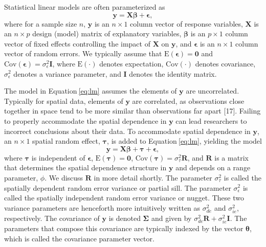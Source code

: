\documentclass[10pt,letterpaper]{article}
\begin{document}
Statistical linear models are often parameterized as
\begin{equation}\label{eq:lm}
 \mathbf{y} = \mathbf{X} \boldsymbol{\beta} + \boldsymbol{\epsilon},
\end{equation} where for a sample size \(n\), \(\mathbf{y}\) is an
\(n \times 1\) column vector of response variables, \(\mathbf{X}\) is an
\(n \times p\) design (model) matrix of explanatory variables,
\(\boldsymbol{\beta}\) is an \(p \times 1\) column vector of fixed
effects controlling the impact of \(\mathbf{X}\) on \(\mathbf{y}\), and
\(\boldsymbol{\epsilon}\) is an \(n \times 1\) column vector of random
errors. We typically assume that
\(\text{E}(\boldsymbol{\epsilon}) = \mathbf{0}\) and
\(\text{Cov}(\boldsymbol{\epsilon}) = \sigma^2_\epsilon \mathbf{I}\),
where \(\text{E}(\cdot)\) denotes expectation, \(\text{Cov}(\cdot)\)
denotes covariance, \(\sigma^2_\epsilon\) denotes a variance parameter,
and \(\mathbf{I}\) denotes the identity matrix.

The model in Equation\(~\)\ref{eq:lm} assumes the elements of
\(\mathbf{y}\) are uncorrelated. Typically for spatial data, elements of
\(\mathbf{y}\) are correlated, as observations close together in space
tend to be more similar than observations far apart {[}17{]}. Failing to
properly accommodate the spatial dependence in \(\mathbf{y}\) can lead
researchers to incorrect conclusions about their data. To accommodate
spatial dependence in \(\mathbf{y}\), an \(n \times 1\) spatial random
effect, \(\boldsymbol{\tau}\), is added to Equation\(~\)\ref{eq:lm},
yielding the model \begin{equation}\label{eq:splm}
 \mathbf{y} = \mathbf{X} \boldsymbol{\beta} + \boldsymbol{\tau} + \boldsymbol{\epsilon},
\end{equation} where \(\boldsymbol{\tau}\) is independent of
\(\boldsymbol{\epsilon}\), \(\text{E}(\boldsymbol{\tau}) = \mathbf{0}\),
\(\text{Cov}(\boldsymbol{\tau}) = \sigma^2_\tau \mathbf{R}\), and
\(\mathbf{R}\) is a matrix that determines the spatial dependence
structure in \(\mathbf{y}\) and depends on a range parameter, \(\phi\).
We discuss \(\mathbf{R}\) in more detail shortly. The parameter
\(\sigma^2_\tau\) is called the spatially dependent random error
variance or partial sill. The parameter \(\sigma^2_\epsilon\) is called
the spatially independent random error variance or nugget. These two
variance parameters are henceforth more intuitively written as
\(\sigma^2_{de}\) and \(\sigma^2_{ie}\), respectively. The covariance of
\(\mathbf{y}\) is denoted \(\boldsymbol{\Sigma}\) and given by
\(\sigma^2_{de} \mathbf{R} + \sigma^2_{ie} \mathbf{I}\). The parameters
that compose this covariance are typically indexed by the vector
\(\boldsymbol{\theta}\), which is called the covariance parameter
vector.
\end{document}
